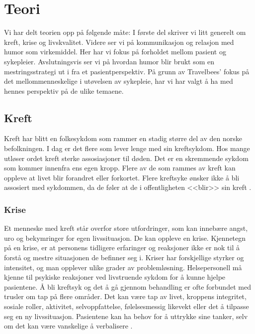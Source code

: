 \chapter{Teori}

Vi har delt teorien opp på følgende måte: I første del skriver vi litt generelt
om kreft, krise og livskvalitet. Videre ser vi på kommunikasjon og relasjon med
humor som virkemiddel. Her har vi fokus på forholdet mellom pasient og
sykepleier. Avslutningsvis ser vi på hvordan humor blir brukt som en
mestringsstrategi ut i fra et pasientperspektiv. På grunn av Travelbees' fokus
på det mellommenneskelige i utøvelsen av sykepleie, har vi har valgt å ha med
hennes perspektiv på de ulike temaene.

\section{Kreft}

Kreft har blitt en folkesykdom som rammer en stadig større del av den norske
befolkningen. I dag er det flere som lever lenge med sin kreftsykdom. Hos mange
utløser ordet kreft sterke assosiasjoner til døden. Det er en skremmende sykdom
som kommer innenfra ens egen kropp. Flere av de som rammes av kreft kan oppleve
at livet blir forandret eller forkortet. Flere kreftsyke ønsker ikke å bli
assosiert med sykdommen, da de føler at de i offentligheten <<blir>> sin kreft
\cite[s.~8--10]{amas2007}.

\subsection{Krise}

Et menneske med kreft står overfor store utfordringer, som kan innebære angst,
uro og bekymringer for egen livssituasjon. De kan oppleve en krise. Kjennetegn
på en krise, er at personens tidligere erfaringer og reaksjoner ikke er nok til
å forstå og mestre situasjonen de befinner seg i. Kriser har forskjellige
styrker og intensitet, og man opplever ulike grader av problemløsning.
Helsepersonell må kjenne til psykiske reaksjoner ved livstruende sykdom for å
kunne hjelpe pasientene. Å bli kreftsyk og det å gå gjennom behandling er ofte
forbundet med trusler om tap på flere områder. Det kan være tap av livet,
kroppens integritet, sosiale roller, aktivitet, selvoppfattelse, følelsesmessig
likevekt eller det å tilpasse seg en ny livssituasjon. Pasientene kan ha behov
for å uttrykke sine tanker, selv om det kan være vanskelige å verbalisere
\cite[s.~48--53]{reitan2008.kommunikasjon}.

